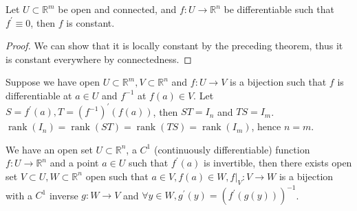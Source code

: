 \begin{corollary}
    Let $U\subset\mathbb R^m$ be open and connected, and $f:U\to\mathbb R^n$ be differentiable such that $f^\prime\equiv 0$, then $f$ is constant.
\end{corollary}
\begin{proof}
    We can show that it is locally constant by the preceding theorem, thus it is constant everywhere by connectedness.
\end{proof}
\begin{remark}
    Suppose we have open $U\subset\mathbb R^m,V\subset\mathbb R^n$ and $f:U\to V$ is a bijection such that $f$ is differentiable at $a\in U$ and $f^{-1}$ at $f(a)\in V$.
    Let $S=f^\prime(a), T=(f^{-1})^\prime(f(a))$, then $ST=I_n$ and $TS=I_m$.
    $\operatorname{rank}(I_n)=\operatorname{rank}(ST)=\operatorname{rank}(TS)=\operatorname{rank}(I_m)$, hence $n=m$.
\end{remark}
\begin{theorem}
    We have an open set $U\subset\mathbb R^n$, a $C^1$ (continuously differentiable) function $f:U\to\mathbb R^n$ and a point $a\in U$ such that $f^\prime(a)$ is invertible, then there exists open set $V\subset U,W\subset\mathbb R^n$ open such that $a\in V,f(a)\in W,f|_{V}:V\to W$ is a bijection with a $C^1$ inverse $g:W\to V$ and $\forall y\in W,g^\prime(y)=(f^\prime(g(y)))^{-1}$.
\end{theorem}

